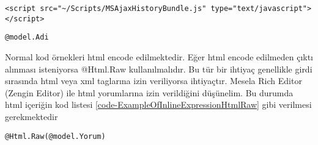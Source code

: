 \documentclass[10pt,a4paper]{article}
\begin{document}
\begin{lstlisting}[label=code-ExampleOfInlineExpression2,caption=html içinde kod örneği 2]
<script src="~/Scripts/MSAjaxHistoryBundle.js" type="text/javascript"></script>
\end{lstlisting}


\begin{lstlisting}[label=code-ExampleOfInlineExpression3,caption=html içinde kod örneği 3]
@model.Adi
\end{lstlisting}

Normal kod örnekleri html encode edilmektedir.
Eğer html encode edilmeden çıktı alınması isteniyorsa @Html.Raw kullanılmalıdır.
Bu tür bir ihtiyaç genellikle girdi sırasında html veya xml taglarına izin veriliyorsa ihtiyaçtır.
Mesela Rich Editor (Zengin Editor) ile html yorumlarına izin verildiğini düşünelim.
Bu durumda html içeriğin kod listesi \ref{code-ExampleOfInlineExpressionHtmlRaw}
gibi verilmesi gerekmektedir

\begin{lstlisting}[label=code-ExampleOfInlineExpressionHtmlRaw,caption=html içinde kod örneği html encode yapılmadan]
@Html.Raw(@model.Yorum)
\end{lstlisting}






% 

\end{document}
